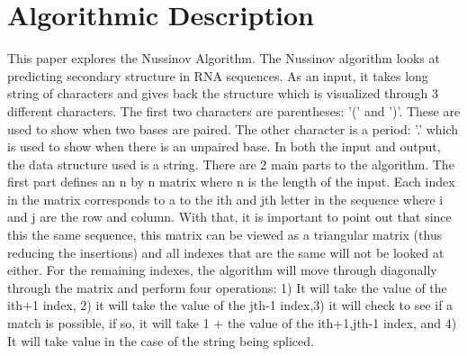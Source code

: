 \documentclass{article}
\begin{document}
\section*{Algorithmic Description}
This paper explores the Nussinov Algorithm. The Nussinov algorithm looks at predicting secondary structure in RNA sequences. As an input, it takes long string of characters and gives back the structure which is visualized  through 3 different characters. The first two characters are parentheses: '(' and ')'. These are used to show when two bases are paired. The other character is a period: '.' which is used to show when there is an unpaired base. In both the input and output, the data structure used is a string. There are 2 main parts to the algorithm. The first part defines an n by n matrix where n is the length of the input. Each index in the matrix corresponds to a to the ith and jth letter in the sequence where i and j are the row and column. With that, it is important to point out that since this the same sequence, this matrix can be viewed as a triangular matrix (thus reducing the insertions) and all indexes that are the same will not be looked at either. For the remaining indexes, the algorithm will move through diagonally through the matrix and perform four operations: 1) It will take the value of the ith+1 index, 2) it will take the value of the jth-1 index,3) it will check to see if a match is possible, if so, it will take 1 + the value of the ith+1,jth-1 index, and 4) It will take value in the case of the string being spliced. 



\end{document}
